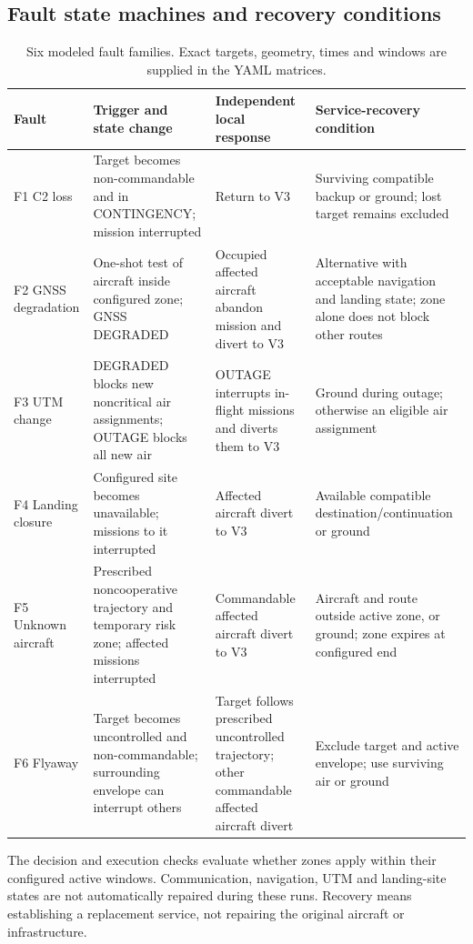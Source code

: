 \documentclass[11pt,a4paper]{article}
\begin{document}
\subsection{Fault state machines and recovery conditions}

\begin{table}[H]\centering\footnotesize
\caption{Six modeled fault families. Exact targets, geometry, times and windows are supplied in the YAML matrices.}\label{tab:S14}
\begin{tabularx}{\textwidth}{@{}lYYY@{}}\toprule
Fault & Trigger and state change & Independent local response & Service-recovery condition \\\midrule
F1 C2 loss & Target becomes non-commandable and in CONTINGENCY; mission interrupted & Return to V3 & Surviving compatible backup or ground; lost target remains excluded \\
F2 GNSS degradation & One-shot test of aircraft inside configured zone; GNSS DEGRADED & Occupied affected aircraft abandon mission and divert to V3 & Alternative with acceptable navigation and landing state; zone alone does not block other routes \\
F3 UTM change & DEGRADED blocks new noncritical air assignments; OUTAGE blocks all new air & OUTAGE interrupts in-flight missions and diverts them to V3 & Ground during outage; otherwise an eligible air assignment \\
F4 Landing closure & Configured site becomes unavailable; missions to it interrupted & Affected aircraft divert to V3 & Available compatible destination/continuation or ground \\
F5 Unknown aircraft & Prescribed noncooperative trajectory and temporary risk zone; affected missions interrupted & Commandable affected aircraft divert to V3 & Aircraft and route outside active zone, or ground; zone expires at configured end \\
F6 Flyaway & Target becomes uncontrolled and non-commandable; surrounding envelope can interrupt others & Target follows prescribed uncontrolled trajectory; other commandable affected aircraft divert & Exclude target and active envelope; use surviving air or ground \\\bottomrule
\end{tabularx}\end{table}

The decision and execution checks evaluate whether zones apply within their configured active windows. Communication, navigation, UTM and landing-site states are not automatically repaired during these runs. Recovery means establishing a replacement service, not repairing the original aircraft or infrastructure.
\end{document}
